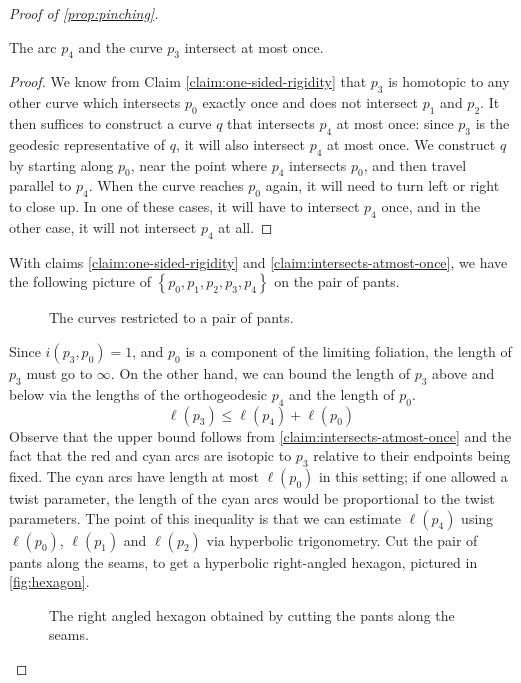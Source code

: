\documentclass[12pt, reqno]{amsart}
\begin{document}
\begin{proof}[Proof of \autoref{prop:pinching}]
  \begin{claim}
    \label{claim:intersects-atmost-once}
    The arc $p_4$ and the curve $p_3$ intersect at most once.
  \end{claim}
  \begin{proof}
    We know from Claim \ref{claim:one-sided-rigidity} that $p_3$ is homotopic to any other curve which intersects $p_0$ exactly once and does not intersect $p_1$ and $p_2$.
    It then suffices to construct a curve $q$ that intersects $p_4$ at most once: since $p_3$ is the geodesic representative of $q$, it will also intersect $p_4$ at most once.
    We construct $q$ by starting along $p_0$, near the point where $p_4$ intersects $p_0$, and then travel parallel to $p_4$.
    When the curve reaches $p_0$ again, it will need to turn left or right to close up. In one of these cases, it will have to intersect $p_4$ once, and in the other case, it will not intersect $p_4$ at all.
  \end{proof}
  With claims \ref{claim:one-sided-rigidity} and \ref{claim:intersects-atmost-once}, we have the following picture of $\left\{ p_0, p_1, p_2, p_3, p_4 \right\}$ on the pair of pants.
  \begin{figure}[h]
    \centering
    \caption{The curves restricted to a pair of pants.}
    \label{fig:pants}
  \end{figure}


  Since $i(p_3, p_0) = 1$, and $p_0$ is a component of the limiting foliation, the length of $p_3$ must go to $\infty$.
  On the other hand, we can bound the length of $p_3$ above and below via the lengths of the orthogeodesic $p_4$ and the length of $p_0$.
 \begin{equation}
   \label{eq:up-1}
   \ell(p_3) \leq \ell(p_4) + \ell(p_0)
 \end{equation}
 Observe that the upper bound follows from \autoref{claim:intersects-atmost-once} and the fact that the red and cyan arcs are isotopic to $p_3$ relative to their endpoints being fixed.
 The cyan arcs have length at most $\ell(p_0)$ in this setting; if one allowed a twist parameter, the length of the cyan arcs would be proportional to the twist parameters.
 The point of this inequality is that we can estimate $\ell(p_4)$ using $\ell(p_0)$, $\ell(p_1)$ and $\ell(p_2)$ via hyperbolic trigonometry.
 Cut the pair of pants along the seams, to get a hyperbolic right-angled hexagon, pictured in \autoref{fig:hexagon}.
 \begin{figure}[h]
   \centering
   \caption{The right angled hexagon obtained by cutting the pants along the seams.}
   \label{fig:hexagon}
 \end{figure}


\end{proof}
\end{document}
